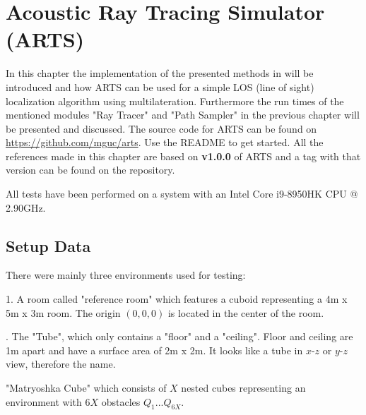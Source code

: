 \chapter{Acoustic Ray Tracing Simulator (ARTS)}\label{chap:experiments}
In this chapter the implementation of the presented methods in  will be introduced and how ARTS can be used for a simple LOS (line of sight) localization algorithm using multilateration.
Furthermore the run times of the mentioned modules "Ray Tracer" and "Path Sampler" in the previous chapter will be presented and discussed.\newline
The source code for ARTS can be found on \url{https://github.com/mguc/arts}.
Use the README to get started.
All the references made in this chapter are based on \textbf{v1.0.0} of ARTS and a tag with that version can be found on the repository.

All tests have been performed on a system with an Intel Core i9-8950HK CPU @ 2.90GHz.

\newpage
\section{Setup Data}
There were mainly three environments used for testing:

1. A room called "reference room" which features a cuboid representing a 4m x 5m x 3m room. The origin $(0,0,0)$ is located in the center of the room.

. The "Tube", which only contains a "floor" and a "ceiling". Floor and ceiling are 1m apart and have a surface area of 2m x 2m. It looks like a tube in $x$-$z$ or $y$-$z$ view, therefore the name.

\newpage
"Matryoshka Cube" which consists of $X$ nested cubes representing an environment with $6X$ obstacles $Q_1 ... Q_{6X}$.


\newpage
